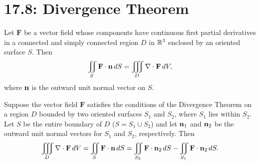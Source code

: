 \documentclass[mathNotesPreamble]{subfiles}
\begin{document}
\section{17.8: Divergence Theorem}

  \begin{thmBox*}
    Let $\mathbf F$ be a vector field whose components have continuous first partial derivatives in a connected and simply connected region $D$ in $\mathbb{R}^3$ enclosed by an oriented surface $S$. Then
      \[\iint\limits_S \mathbf F\cdot{\mathbf{n}}\,dS=\iiint\limits_D\nabla\cdot\mathbf F\,dV,\]
    where ${\mathbf{n}}$ is the outward unit normal vector on $S$.
  \end{thmBox*}

  \begin{thmBox*}
    Suppose the vector field $\mathbf F$ satisfies the conditions of the Divergence Theorem on a region $D$ bounded by two oriented surfaces $S_1$ and $S_2$, where $S_1$ lies within $S_2$. Let $S$ be the entire boundary of $D$ ($S=S_1\cup S_2$) and let ${\mathbf{n}}_1$ and ${\mathbf{n}}_2$ be the outward unit normal vectors for $S_1$ and $S_2$, respectively. Then
      \[\iiint\limits_D \nabla\cdot\mathbf F\,dV = \iint\limits_S \mathbf F\cdot{\mathbf{n}}\,dS = \iint\limits_{S_2} \mathbf F\cdot{\mathbf{n}}_2\,dS-\iint\limits_{S_1}\mathbf F\cdot{\mathbf{n}}_2\,dS.\]
  \end{thmBox*}

  \pagebreak
  
\end{document}
